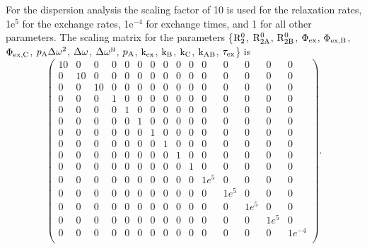 For the dispersion analysis the scaling factor of 10 is used for the relaxation rates, 1e$^5$ for the exchange rates, 1e$^{-4}$ for exchange times, and 1 for all other parameters.
The scaling matrix for the parameters \{$\mathrm{R}_2^0$, $\mathrm{R}_\mathrm{2A}^0$, $\mathrm{R}_\mathrm{2B}^0$, $\Phi_\textrm{ex}$, $\Phi_\textrm{ex,B}$, $\Phi_\textrm{ex,C}$, $p_\textrm{A}\Delta\omega^2$, $\Delta\omega$, $\Delta\omega^{\scriptscriptstyle\mathrm{H}}$, $p_\textrm{A}$, $\textrm{k}_\textrm{ex}$, $\textrm{k}_\textrm{B}$, $\textrm{k}_\textrm{C}$, $\textrm{k}_\textrm{AB}$, $\tau_\textrm{ex}$\} is
\begin{equation}
    \begin{pmatrix}
        10 & 0  & 0  & 0 & 0 & 0 & 0 & 0 & 0 & 0 & 0    & 0    & 0    & 0    & 0       \\
        0  & 10 & 0  & 0 & 0 & 0 & 0 & 0 & 0 & 0 & 0    & 0    & 0    & 0    & 0       \\
        0  & 0  & 10 & 0 & 0 & 0 & 0 & 0 & 0 & 0 & 0    & 0    & 0    & 0    & 0       \\
        0  & 0  & 0  & 1 & 0 & 0 & 0 & 0 & 0 & 0 & 0    & 0    & 0    & 0    & 0       \\
        0  & 0  & 0  & 0 & 1 & 0 & 0 & 0 & 0 & 0 & 0    & 0    & 0    & 0    & 0       \\
        0  & 0  & 0  & 0 & 0 & 1 & 0 & 0 & 0 & 0 & 0    & 0    & 0    & 0    & 0       \\
        0  & 0  & 0  & 0 & 0 & 0 & 1 & 0 & 0 & 0 & 0    & 0    & 0    & 0    & 0       \\
        0  & 0  & 0  & 0 & 0 & 0 & 0 & 1 & 0 & 0 & 0    & 0    & 0    & 0    & 0       \\
        0  & 0  & 0  & 0 & 0 & 0 & 0 & 0 & 1 & 0 & 0    & 0    & 0    & 0    & 0       \\
        0  & 0  & 0  & 0 & 0 & 0 & 0 & 0 & 0 & 1 & 0    & 0    & 0    & 0    & 0       \\
        0  & 0  & 0  & 0 & 0 & 0 & 0 & 0 & 0 & 0 & 1e^5 & 0    & 0    & 0    & 0       \\
        0  & 0  & 0  & 0 & 0 & 0 & 0 & 0 & 0 & 0 & 0    & 1e^5 & 0    & 0    & 0       \\
        0  & 0  & 0  & 0 & 0 & 0 & 0 & 0 & 0 & 0 & 0    & 0    & 1e^5 & 0    & 0       \\
        0  & 0  & 0  & 0 & 0 & 0 & 0 & 0 & 0 & 0 & 0    & 0    & 0    & 1e^5 & 0       \\
        0  & 0  & 0  & 0 & 0 & 0 & 0 & 0 & 0 & 0 & 0    & 0    & 0    & 0    & 1e^{-4} \\
    \end{pmatrix}.
\end{equation}




